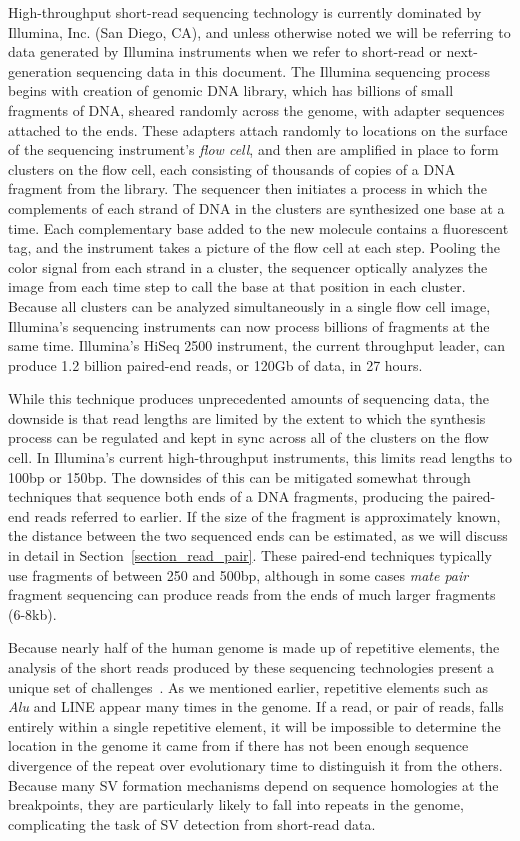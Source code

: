 High-throughput short-read sequencing technology is currently dominated by Illumina, Inc. (San Diego, CA), and unless otherwise noted we will be referring to data generated by Illumina instruments when we refer to short-read or next-generation sequencing data in this document. The Illumina sequencing process begins with creation of genomic DNA library, which has billions of small fragments of DNA, sheared randomly across the genome, with adapter sequences attached to the ends. These adapters attach randomly to locations on the surface of the sequencing instrument's \emph{flow cell}, and then are amplified in place to form clusters on the flow cell, each consisting of thousands of copies of a DNA fragment from the library. The sequencer then initiates a process in which the complements of each strand of DNA in the clusters are synthesized one base at a time. Each complementary base added to the new molecule contains a fluorescent tag, and the instrument takes a picture of the flow cell at each step. Pooling the color signal from each strand in a cluster, the sequencer optically analyzes the image from each time step to call the base at that position in each cluster. Because all clusters can be analyzed simultaneously in a single flow cell image, Illumina's sequencing instruments can now process billions of fragments at the same time. Illumina's HiSeq 2500 instrument, the current throughput leader, can produce 1.2 billion paired-end reads, or 120Gb of data, in 27 hours. 

While this technique produces unprecedented amounts of sequencing data, the downside is that read lengths are limited by the extent to which the synthesis process can be regulated and kept in sync across all of the clusters on the flow cell. In Illumina's current high-throughput instruments, this limits read lengths to 100bp or 150bp. The downsides of this can be mitigated somewhat through techniques that sequence both ends of a DNA fragments, producing the paired-end reads referred to earlier. If the size of the fragment is approximately known, the distance between the two sequenced ends can be estimated, as we will discuss in detail in Section~\ref{section_read_pair}. These paired-end techniques typically use fragments of between 250 and 500bp, although in some cases \emph{mate pair} fragment sequencing can produce reads from the ends of much larger fragments (6-8kb).

Because nearly half of the human genome is made up of repetitive elements, the analysis of the short reads produced by these sequencing technologies present a unique set of challenges~\cite{Treangen:2011p1810}. As we mentioned earlier, repetitive elements such as \emph{Alu} and LINE appear many times in the genome. If a read, or pair of reads, falls entirely within a single repetitive element, it will be impossible to determine the location in the genome it came from if there has not been enough sequence divergence of the repeat over evolutionary time to distinguish it from the others. Because many SV formation mechanisms depend on sequence homologies at the breakpoints, they are particularly likely to fall into repeats in the genome, complicating the task of SV detection from short-read data.

